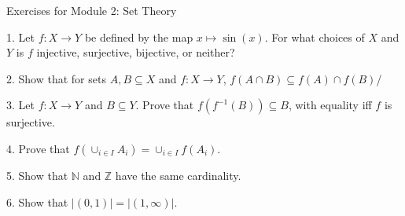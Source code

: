 \documentclass{article}
\theoremstyle{remark} %
\newcommand{\Z}{{\mathbb{Z}}}
\newcommand{\N}{{\mathbb{N}}}
\begin{document}
\begin{center}
\Large{Exercises for Module 2: Set Theory}
\end{center}


1.  Let $f: X \to Y$ be defined by the map $x \mapsto \sin(x)$. For what choices of $X$ and $Y$ is $f$ injective, surjective, bijective, or neither?

\vspace{12cm} %




2. Show that for sets $A,B \subseteq X$ and $f: X \to Y$, $f(A \cap B) \subseteq f(A) \cap f(B)$/

\vspace{11cm} %



3. Let $f: X \to Y$ and $B \subseteq Y$. Prove that $f(f^{-1}(B)) \subseteq B$, with equality iff $f$ is surjective.

\vspace{12cm} %




4. Prove that $f(\cup_{i \in I}A_i) = \cup_{i \in I}f(A_i)$.

\vspace{11cm} %




5. Show that $\N$ and $\Z$ have the same cardinality. 

\vspace{12cm} %




6. Show that $|(0,1)| =|(1,\infty)|$.

\vspace{11cm} %
\end{document}
